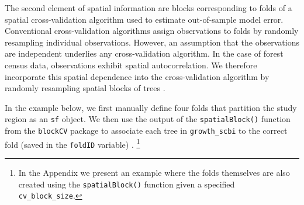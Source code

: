 \documentclass[12pt]{article}
\begin{document}
The second element of spatial information are blocks corresponding to
folds of a spatial cross-validation algorithm used to estimate
out-of-sample model error. Conventional cross-validation algorithms
assign observations to folds by randomly resampling individual
observations. However, an assumption that the observations are
independent underlies any cross-validation algorithm. In the case of
forest census data, observations exhibit spatial autocorrelation. We
therefore incorporate this spatial dependence into the cross-validation
algorithm by randomly resampling spatial blocks of trees
\citet{roberts_cross-validation_2017}
\citet{pohjankukka_estimating_2017}.

In the example below, we first manually define four folds that partition
the study region as an \texttt{sf} object. We then use the output of the
\texttt{spatialBlock()} function from the \texttt{blockCV} package to
associate each tree in \texttt{growth\_scbi} to the correct fold (saved
in the \texttt{foldID} variable) \citet{valavi_blockcv_2019}. \footnote{In
  the Appendix we present an example where the folds themselves are also
  created using the \texttt{spatialBlock()} function given a specified
  \texttt{cv\_block\_size}.}
\end{document}
